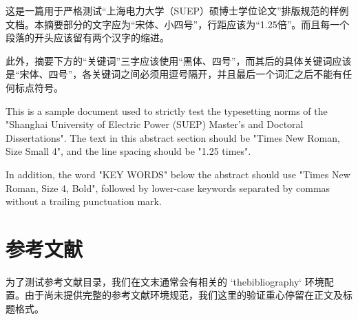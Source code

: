 \documentclass[degree=master,degreetype=academic]{suepthesis}
\begin{document}
\MakeTitle

\makeauthpage

\begin{cnabstract}
这是一篇用于严格测试“上海电力大学（SUEP）硕博士学位论文”排版规范的样例文档。本摘要部分的文字应为“宋体、小四号”，行距应该为“1.25倍”。而且每一个段落的开头应该留有两个汉字的缩进。

此外，摘要下方的“关键词”三字应该使用“黑体、四号”，而其后的具体关键词应该是“宋体、四号”，各关键词之间必须用逗号隔开，并且最后一个词汇之后不能有任何标点符号。

\end{cnabstract}

\begin{enabstract}
This is a sample document used to strictly test the typesetting norms of the "Shanghai University of Electric Power (SUEP) Master's and Doctoral Dissertations". The text in this abstract section should be "Times New Roman, Size Small 4", and the line spacing should be "1.25 times". 

In addition, the word "KEY WORDS" below the abstract should use "Times New Roman, Size 4, Bold", followed by lower-case keywords separated by commas without a trailing punctuation mark.

\end{enabstract}

\tableofcontents

\clearpage
\pagestyle{suep_header}





\section{参考文献}
为了测试参考文献目录，我们在文末通常会有相关的 `thebibliography` 环境配置。由于尚未提供完整的参考文献环境规范，我们这里的验证重心停留在正文及标题格式。
\end{document}

